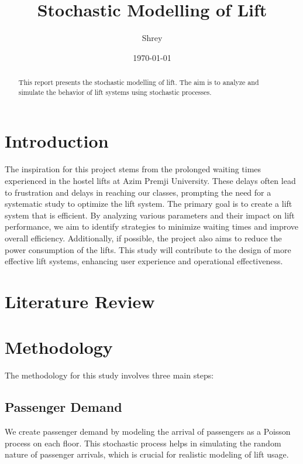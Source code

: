 \documentclass[12pt]{report}
\title{Stochastic Modelling of Lift}
\author{Shrey}
\date{\today}
\begin{document}
\maketitle

\begin{abstract}
This report presents the stochastic modelling of lift. The aim is to analyze and simulate the behavior of lift systems using stochastic processes.
\end{abstract}

\tableofcontents
\renewcommand{\thesection}{\arabic{section}}
\pagebreak
\section{Introduction}
\label{chap:intro}
The inspiration for this project stems from the prolonged waiting times experienced in the hostel lifts at Azim Premji University. These delays often lead to frustration and delays in reaching our classes, prompting the need for a systematic study to optimize the lift system. The primary goal is to create a lift system that is efficient. By analyzing various parameters and their impact on lift performance, we aim to identify strategies to minimize waiting times and improve overall efficiency. Additionally, if possible, the project also aims to reduce the power consumption of the lifts. This study will contribute to the design of more effective lift systems, enhancing user experience and operational effectiveness.
\pagebreak
\section{Literature Review}
\label{chap:literature}
\pagebreak
\section{Methodology}
\label{chap:methodology}

The methodology for this study involves three main steps:

\subsection{Passenger Demand}
We create passenger demand by modeling the arrival of passengers as a Poisson process on each floor. This stochastic process helps in simulating the random nature of passenger arrivals, which is crucial for realistic modeling of lift usage.
\end{document}
